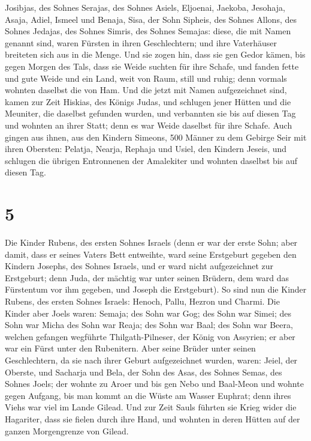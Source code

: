 Josibjas, des Sohnes Serajas, des Sohnes Asiels, 
Eljoenai, Jaekoba, Jesohaja, Asaja, Adiel, Ismeel und Benaja,
 Sisa, der Sohn Sipheis, des Sohnes Allons, des Sohnes
Jedajas, des Sohnes Simris, des Sohnes Semajas:  diese,
die mit Namen genannt sind, waren Fürsten in ihren Geschlechtern; und
ihre Vaterhäuser breiteten sich aus in die Menge.  Und
sie zogen hin, dass sie gen Gedor kämen, bis gegen Morgen des Tals, dass
sie Weide suchten für ihre Schafe,  und fanden fette und
gute Weide und ein Land, weit von Raum, still und ruhig; denn vormals
wohnten daselbst die von Ham.  Und die jetzt mit Namen
aufgezeichnet sind, kamen zur Zeit Hiskias, des Königs Judas, und
schlugen jener Hütten und die Meuniter, die daselbst gefunden wurden,
und verbannten sie bis auf diesen Tag und wohnten an ihrer Statt; denn
es war Weide daselbst für ihre Schafe.  Auch gingen aus
ihnen, aus den Kindern Simeons, 500 Männer zu dem Gebirge Seir mit ihren
Obersten: Pelatja, Nearja, Rephaja und Usiel, den Kindern Jeseis,
 und schlugen die übrigen Entronnenen der Amalekiter und
wohnten daselbst bis auf diesen Tag.

\hypertarget{section-4}{%
\section{5}\label{section-4}}

 Die Kinder Rubens, des ersten Sohnes Israels (denn er war
der erste Sohn; aber damit, dass er seines Vaters Bett entweihte, ward
seine Erstgeburt gegeben den Kindern Josephs, des Sohnes Israels, und er
ward nicht aufgezeichnet zur Erstgeburt;  denn Juda, der
mächtig war unter seinen Brüdern, dem ward das Fürstentum vor ihm
gegeben, und Joseph die Erstgeburt).  So sind nun die
Kinder Rubens, des ersten Sohnes Israels: Henoch, Pallu, Hezron und
Charmi.  Die Kinder aber Joels waren: Semaja; des Sohn war
Gog; des Sohn war Simei;  des Sohn war Micha des Sohn war
Reaja; des Sohn war Baal;  des Sohn war Beera, welchen
gefangen wegführte Thilgath-Pilneser, der König von Assyrien; er aber
war ein Fürst unter den Rubenitern.  Aber seine Brüder
unter seinen Geschlechtern, da sie nach ihrer Geburt aufgezeichnet
wurden, waren: Jeiel, der Oberste, und Sacharja  und Bela,
der Sohn des Asas, des Sohnes Semas, des Sohnes Joels; der wohnte zu
Aroer und bis gen Nebo und Baal-Meon  und wohnte gegen
Aufgang, bis man kommt an die Wüste am Wasser Euphrat; denn ihres Viehs
war viel im Lande Gilead.  Und zur Zeit Sauls führten sie
Krieg wider die Hagariter, dass sie fielen durch ihre Hand, und wohnten
in deren Hütten auf der ganzen Morgengrenze von Gilead.

